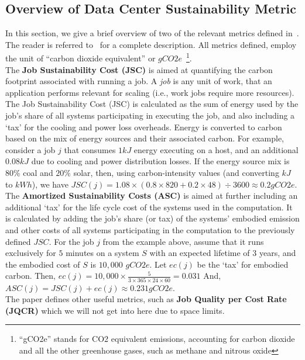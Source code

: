 \subsection{Overview of Data Center Sustainability Metric}
\label{overview}
In this section, we give a brief overview of two of the relevant metrics defined in~\cite{gandhi2022metrics}. 
The reader is referred to~\cite{gandhi2022metrics} for a complete description.
All metrics defined, employ the unit of “carbon dioxide equivalent” or $gCO2e$~\footnote{“gCO2e” stands for CO2 equivalent emissions, accounting for carbon dioxide and all the other greenhouse gases, such as methane and nitrous oxide}.
%
\\
The \textbf{Job Sustainability Cost (JSC)} is aimed at quantifying the carbon footprint associated with running a job. A {\em job} is any unit of work, that an application performs relevant for scaling (i.e., work jobs require more resources). The Job Sustainability Cost (JSC) is calculated as the sum of energy used by the job's share of all systems participating in executing the job, and also including a `tax' for the cooling 
and power loss overheads. Energy is converted to carbon based on the mix of energy sources and their associated carbon. For example, consider a job $j$ that consumes $1kJ$ energy executing on a host, and an additional $0.08kJ$ due to cooling and power distribution losses. If the energy source mix is $80\%$ coal and $20\%$ solar, then, using carbon-intensity values (and converting $kJ$ to $kWh$), we have $JSC(j) = 1.08 \times (0.8 \times 820 + 0.2 \times 48) \div 3600 \approx 0.2gCO2e$.  
\\
The \textbf{Amortized Sustainability Costs (ASC)} is aimed at further including an additional `tax' for the life cycle cost of the systems used in the computation. It is calculated by adding the job’s share (or tax) of the systems' embodied emission and other costs of all systems 
participating in the computation to the previously defined $JSC$. For the job $j$ from the example above, assume that it runs exclusively for $5$ minutes on a system $S$ with an expected lifetime of $3$ years, and the embodied cost of $S$  is $10,000$ $gCO2e$. Let $ec(j)$ be the `tax' for embodied carbon. Then, $ec(j) = 10,000 \times \frac{5}{3\times 365 \times 24 \times 60} = 0.031$ And, $ASC(j) = JSC(j)  +  ec(j) \approx 0.231gCO2e$. 
\\
The paper defines other useful metrics, such as {\bf Job Quality per Cost Rate (JQCR)} which we will not get into here due to space limits. 
